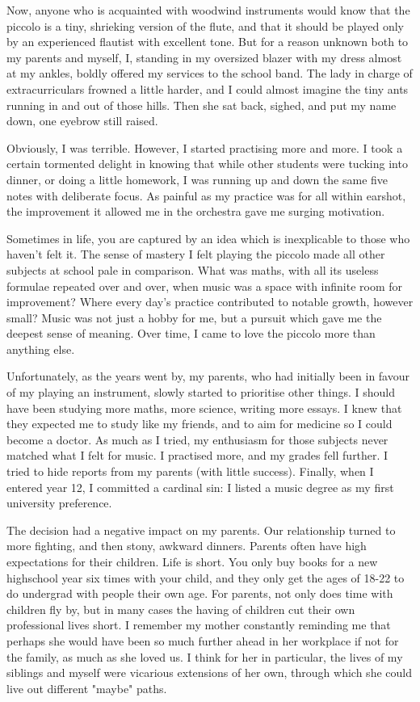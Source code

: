\documentclass[a4paper]{article}
\begin{document}
Now, anyone who is acquainted with woodwind instruments would know that the piccolo is a tiny, shrieking version of the flute, and that it should be played only by an experienced flautist with excellent tone. But for a reason unknown both to my parents and myself, I, standing in my oversized blazer with my dress almost at my ankles, boldly offered my services to the school band. The lady in charge of extracurriculars frowned a little harder, and I could almost imagine the tiny ants running in and out of those hills. Then she sat back, sighed, and put my name down, one eyebrow still raised.

Obviously, I was terrible. However, I started practising more and more. I took a certain tormented delight in knowing that while other students were tucking into dinner, or doing a little homework, I was running up and down the same five notes with deliberate focus. As painful as my practice was for all within earshot, the improvement it allowed me in the orchestra gave me surging motivation.

Sometimes in life, you are captured by an idea which is inexplicable to those who haven't felt it. The sense of mastery I felt playing the piccolo made all other subjects at school pale in comparison. What was maths, with all its useless formulae repeated over and over, when music was a space with infinite room for improvement? Where every day's practice contributed to notable growth, however small? Music was not just a hobby for me, but a pursuit which gave me the deepest sense of meaning. Over time, I came to love the piccolo more than anything else.

Unfortunately, as the years went by, my parents, who had initially been in favour of my playing an instrument, slowly started to prioritise other things. I should have been studying more maths, more science, writing more essays. I knew that they expected me to study like my friends, and to aim for medicine so I could become a doctor. As much as I tried, my enthusiasm for those subjects never matched what I felt for music. I practised more, and my grades fell further. I tried to hide reports from my parents (with little success). Finally, when I entered year 12, I committed a cardinal sin: I listed a music degree as my first university preference.

The decision had a negative impact on my parents. Our relationship turned to more fighting, and then stony, awkward dinners. Parents often have high expectations for their children. Life is short. You only buy books for a new highschool year six times with your child, and they only get the ages of 18-22 to do undergrad with people their own age. For parents, not only does time with children fly by, but in many cases the having of children cut their own professional lives short. I remember my mother constantly reminding me that perhaps she would have been so much further ahead in her workplace if not for the family, as much as she loved us. I think for her in particular, the lives of my siblings and myself were vicarious extensions of her own, through which she could live out different "maybe" paths.
\end{document}
